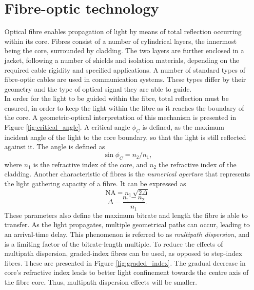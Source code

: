 \documentclass{standalone}
\begin{document}
\chapter{Fibre-optic technology} \label{ch:fibres}
\setcounter{page}\thestranica


Optical fibre enables propagation of light by means of total reflection occurring within its core. Fibres consist of a number of cylindrical layers, the innermost being the core, surrounded by cladding. The two layers are further enclosed in a jacket, following a number of shields and isolation materials, depending on the required cable rigidity and specified applications. A number of standard types of fibre-optic cables are used in communication systems. These types differ by their geometry and the type of optical signal they are able to guide. \\

In order for the light to be guided within the fibre, total reflection must be ensured, in order to keep the light within the fibre as it reaches the boundary of the core. A geometric-optical interpretation of this mechanism is presented in Figure \ref{fig:critical_angle}.
A critical angle $\phi_C$ is defined, as the maximum incident angle of the light to the core boundary, so that the light is still reflected against it. The angle is defined as
\begin{equation}
\sin \phi_C = n_2/n_1 \textrm{,}
\end{equation}
where $n_1$ is the refractive index of the core, and $n_2$ the refractive index of the cladding. Another characteristic of fibres is the \textit{numerical aperture} that represents the light gathering capacity of a fibre. It can be expressed as 
\begin{equation}
\textrm{NA} = n_1 \, \sqrt{2 \varDelta}
\end{equation}
\begin{equation}
\varDelta = \frac{n_1 - n_2}{n_1} \textrm{.}
\end{equation}
These parameters also define the maximum bitrate and length the fibre is able to transfer. As the light propagates, multiple geometrical paths can occur, leading to an arrival-time delay. This phenomenon is referred to as \textit{multipath dispersion}, and is a limiting factor of the bitrate-length multiple. To reduce the effects of multipath dispersion, graded-index fibres can be used, as opposed to step-index fibres. These are presented in Figure \ref{fig:graded_index}.
The gradual decrease in core's refractive index leads to better light confinement towards the centre axis of the fibre core. Thus, multipath dispersion effects will be smaller.\\
\end{document}
